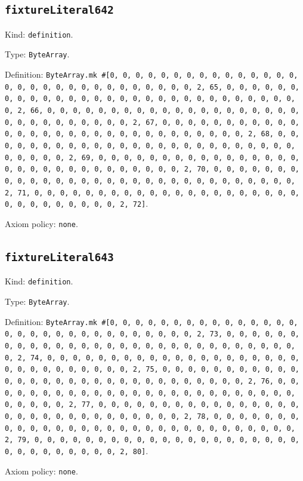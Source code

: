 \documentclass[11pt]{article}
\begin{document}
\subsection*{\texttt{fixtureLiteral642}}
\noindent Kind: \texttt{definition}.\par
\noindent Type: \texttt{ByteArray}.\par
\noindent Definition: \texttt{ByteArray.mk \#[0, 0, 0, 0, 0, 0, 0, 0, 0, 0, 0, 0, 0, 0, 0, 0, 0, 0, 0, 0, 0, 0, 0, 0, 0, 0, 0, 0, 0, 0, 2, 65, 0, 0, 0, 0, 0, 0, 0, 0, 0, 0, 0, 0, 0, 0, 0, 0, 0, 0, 0, 0, 0, 0, 0, 0, 0, 0, 0, 0, 0, 0, 2, 66, 0, 0, 0, 0, 0, 0, 0, 0, 0, 0, 0, 0, 0, 0, 0, 0, 0, 0, 0, 0, 0, 0, 0, 0, 0, 0, 0, 0, 0, 0, 2, 67, 0, 0, 0, 0, 0, 0, 0, 0, 0, 0, 0, 0, 0, 0, 0, 0, 0, 0, 0, 0, 0, 0, 0, 0, 0, 0, 0, 0, 0, 0, 2, 68, 0, 0, 0, 0, 0, 0, 0, 0, 0, 0, 0, 0, 0, 0, 0, 0, 0, 0, 0, 0, 0, 0, 0, 0, 0, 0, 0, 0, 0, 0, 2, 69, 0, 0, 0, 0, 0, 0, 0, 0, 0, 0, 0, 0, 0, 0, 0, 0, 0, 0, 0, 0, 0, 0, 0, 0, 0, 0, 0, 0, 0, 0, 2, 70, 0, 0, 0, 0, 0, 0, 0, 0, 0, 0, 0, 0, 0, 0, 0, 0, 0, 0, 0, 0, 0, 0, 0, 0, 0, 0, 0, 0, 0, 0, 2, 71, 0, 0, 0, 0, 0, 0, 0, 0, 0, 0, 0, 0, 0, 0, 0, 0, 0, 0, 0, 0, 0, 0, 0, 0, 0, 0, 0, 0, 0, 0, 2, 72]}.\par
\noindent Axiom policy: \texttt{none}.\par
\subsection*{\texttt{fixtureLiteral643}}
\noindent Kind: \texttt{definition}.\par
\noindent Type: \texttt{ByteArray}.\par
\noindent Definition: \texttt{ByteArray.mk \#[0, 0, 0, 0, 0, 0, 0, 0, 0, 0, 0, 0, 0, 0, 0, 0, 0, 0, 0, 0, 0, 0, 0, 0, 0, 0, 0, 0, 0, 0, 2, 73, 0, 0, 0, 0, 0, 0, 0, 0, 0, 0, 0, 0, 0, 0, 0, 0, 0, 0, 0, 0, 0, 0, 0, 0, 0, 0, 0, 0, 0, 0, 2, 74, 0, 0, 0, 0, 0, 0, 0, 0, 0, 0, 0, 0, 0, 0, 0, 0, 0, 0, 0, 0, 0, 0, 0, 0, 0, 0, 0, 0, 0, 0, 2, 75, 0, 0, 0, 0, 0, 0, 0, 0, 0, 0, 0, 0, 0, 0, 0, 0, 0, 0, 0, 0, 0, 0, 0, 0, 0, 0, 0, 0, 0, 0, 2, 76, 0, 0, 0, 0, 0, 0, 0, 0, 0, 0, 0, 0, 0, 0, 0, 0, 0, 0, 0, 0, 0, 0, 0, 0, 0, 0, 0, 0, 0, 0, 2, 77, 0, 0, 0, 0, 0, 0, 0, 0, 0, 0, 0, 0, 0, 0, 0, 0, 0, 0, 0, 0, 0, 0, 0, 0, 0, 0, 0, 0, 0, 0, 2, 78, 0, 0, 0, 0, 0, 0, 0, 0, 0, 0, 0, 0, 0, 0, 0, 0, 0, 0, 0, 0, 0, 0, 0, 0, 0, 0, 0, 0, 0, 0, 2, 79, 0, 0, 0, 0, 0, 0, 0, 0, 0, 0, 0, 0, 0, 0, 0, 0, 0, 0, 0, 0, 0, 0, 0, 0, 0, 0, 0, 0, 0, 0, 2, 80]}.\par
\noindent Axiom policy: \texttt{none}.\par
\end{document}
